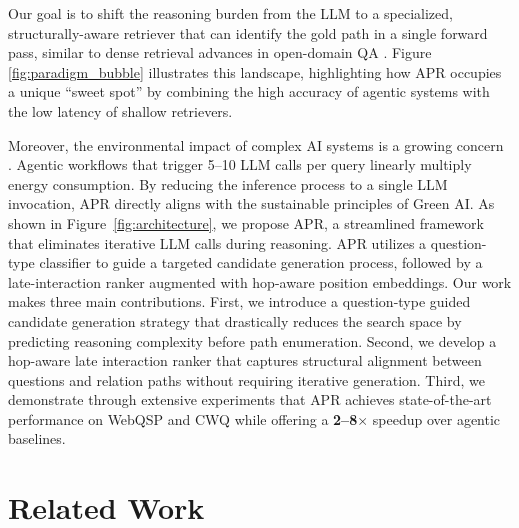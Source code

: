\documentclass[conference]{IEEEtran}
\newcommand{\model}{\textsc{APR}}
\begin{document}

Our goal is to shift the reasoning burden from the LLM to a specialized, structurally-aware retriever that can identify the gold path in a single forward pass, similar to dense retrieval advances in open-domain QA \cite{karpukhin2020dpr, khattab2020colbert}. Figure \ref{fig:paradigm_bubble} illustrates this landscape, highlighting how \model{} occupies a unique “sweet spot” by combining the high accuracy of agentic systems with the low latency of shallow retrievers.%

Moreover, the environmental impact of complex AI systems is a growing concern \cite{schwartz2020green, strubell2019energy}. Agentic workflows that trigger 5--10 LLM calls per query linearly multiply energy consumption. By reducing the inference process to a single LLM invocation, \model{} directly aligns with the sustainable principles of Green AI.
As shown in Figure~\ref{fig:architecture}, we propose \model{}, a streamlined framework that eliminates iterative LLM calls during reasoning. \model{} utilizes a question-type classifier to guide a targeted candidate generation process, followed by a late-interaction ranker augmented with hop-aware position embeddings. Our work makes three main contributions. First, we introduce a question-type guided candidate generation strategy that drastically reduces the search space by predicting reasoning complexity before path enumeration. Second, we develop a hop-aware late interaction ranker that captures structural alignment between questions and relation paths without requiring iterative generation. Third, we demonstrate through extensive experiments that \model{} achieves state-of-the-art performance on WebQSP and CWQ while offering a \textbf{2--8$\times$} speedup over agentic baselines.



\section{Related Work}
\end{document}
